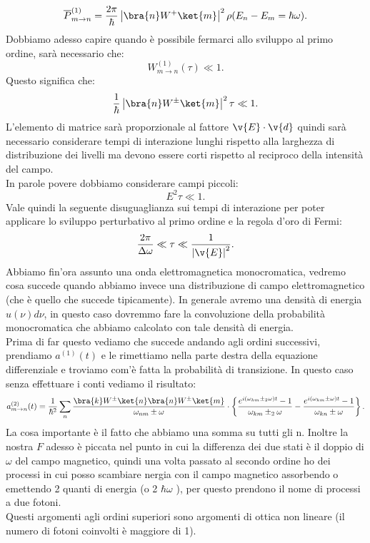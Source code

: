 \[
    \overline{P}^{(1)}_{m\to n} = \frac{2\pi}{\hbar }\left|\bra{n}W^+ \ket{m}\right|^2\rho(E_n-E_m=\hbar \omega) 
.\] 
Dobbiamo adesso capire quando è possibile fermarci allo sviluppo al primo ordine, sarà necessario che:
\[
    W^{(1) }_{m\to n}(\tau) \ll 1
.\] 
Questo significa che:
\[
\frac{1}{\hbar }\left|\bra{n}W^{\pm} \ket{m}\right|^2\tau \ll 1
.\] 
L'elemento di matrice sarà proporzionale al fattore $\v{E}\cdot \v{d}$ quindi sarà necessario considerare tempi di interazione lunghi rispetto alla larghezza di distribuzione dei livelli ma devono essere corti rispetto al reciproco della intensità del campo.\\
In parole povere dobbiamo considerare campi piccoli:
\[
    E^2\tau  \ll 1
.\] 
Vale quindi la seguente disuguaglianza sui tempi di interazione per poter applicare lo sviluppo perturbativo al primo ordine e la regola d'oro di Fermi:
\[
    \frac{2\pi}{\Delta\omega}\ll \tau\ll \frac{1}{\left|\v{E}\right|^2}
.\] 
Abbiamo fin'ora assunto una onda elettromagnetica monocromatica, vedremo cosa succede quando abbiamo invece una distribuzione di campo elettromagnetico (che è quello che succede tipicamente). In generale avremo una densità di energia $u(\nu)d\nu$, in questo caso dovremmo fare la convoluzione della probabilità monocromatica che abbiamo calcolato con tale densità di energia.\\
Prima di far questo vediamo che succede andando agli ordini successivi, prendiamo $a^{(1)}(t) $ e le rimettiamo nella parte destra della equazione differenziale e troviamo com'è fatta la probabilità di transizione. In questo caso senza effettuare i conti vediamo il risultato:
\[
    a^{(2)}_{m\to n}(t) =
    \frac{1}{\hbar ^2} \sum_{n}^{} 
    \frac{\bra{k}W^{\pm}\ket{n} \bra{n}W^{\pm} \ket{m}}{\omega_{nm}\pm \omega}
    \cdot 
    \left\{
	\frac{e^{i(\omega_{km}\pm_2\omega)t}-1}{\omega_{km}\pm_2\omega}
    - \frac{e^{i(\omega_{km}\pm \omega)t}-1}{\omega_{kn}\pm\omega}\right\}
.\] 
La cosa importante è il fatto che abbiamo una somma su tutti gli n. Inoltre la nostra $F$ adesso è piccata nel punto in cui la differenza dei due stati è il doppio di $\omega$ del campo magnetico, quindi una volta passato al secondo ordine ho dei processi in cui posso scambiare nergia con il campo magnetico assorbendo o emettendo 2 quanti di energia (o 2 $\hbar \omega$ ), per questo prendono il nome di processi a due fotoni.\\
Questi argomenti agli ordini superiori sono argomenti di ottica non lineare (il numero di fotoni coinvolti è maggiore di 1).

